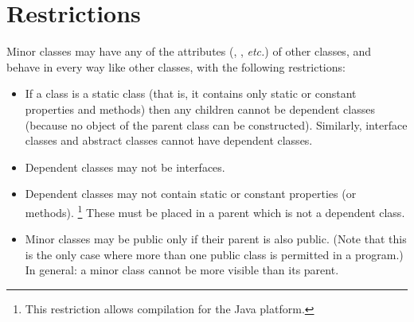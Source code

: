 \section{Restrictions}\label{refsminres}
 
Minor classes may have any of the attributes (,
, \emph{etc.}) of other classes, and behave in every way
like other classes, with the following restrictions:
\begin{itemize}
\item 
If a class is a static class (that is, it contains only static or
constant properties and methods) then any children cannot be dependent
classes (because no object of the parent class can be constructed).
Similarly, interface classes and abstract classes cannot have dependent
classes.
\item 
Dependent classes may not be interfaces.
\item 
{}
Dependent classes may not contain static or constant properties (or
methods).
\footnote{
This restriction allows compilation for the Java platform.
}
These must be placed in a parent which is not a dependent class.
\item 
Minor classes may be public only if their parent is also public.
(Note that this is the only case where more than one public class is
permitted in a program.)  In general: a minor class cannot be more
visible than its parent.
\end{itemize}
\index{,}
\index{,}
